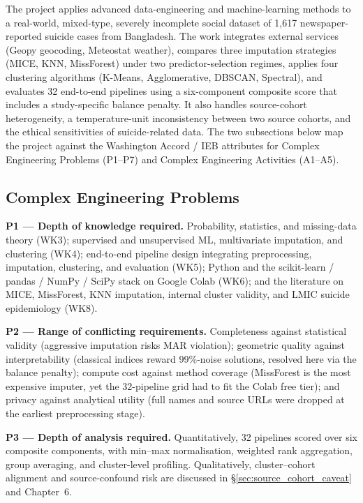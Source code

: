 The project applies advanced data-engineering and machine-learning methods to a real-world, mixed-type, severely incomplete social dataset of 1,617 newspaper-reported suicide cases from Bangladesh. The work integrates external services (Geopy geocoding, Meteostat weather), compares three imputation strategies (MICE, KNN, MissForest) under two predictor-selection regimes, applies four clustering algorithms (K-Means, Agglomerative, DBSCAN, Spectral), and evaluates 32 end-to-end pipelines using a six-component composite score that includes a study-specific balance penalty. It also handles source-cohort heterogeneity, a temperature-unit inconsistency between two source cohorts, and the ethical sensitivities of suicide-related data. The two subsections below map the project against the Washington Accord / IEB attributes for Complex Engineering Problems (P1--P7) and Complex Engineering Activities (A1--A5).

\subsection{Complex Engineering Problems}

\textbf{P1 --- Depth of knowledge required.} Probability, statistics, and missing-data theory (WK3); supervised and unsupervised ML, multivariate imputation, and clustering (WK4); end-to-end pipeline design integrating preprocessing, imputation, clustering, and evaluation (WK5); Python and the scikit-learn / pandas / NumPy / SciPy stack on Google Colab (WK6); and the literature on MICE, MissForest, KNN imputation, internal cluster validity, and LMIC suicide epidemiology (WK8).

\textbf{P2 --- Range of conflicting requirements.} Completeness against statistical validity (aggressive imputation risks MAR violation); geometric quality against interpretability (classical indices reward 99\%-noise solutions, resolved here via the balance penalty); compute cost against method coverage (MissForest is the most expensive imputer, yet the 32-pipeline grid had to fit the Colab free tier); and privacy against analytical utility (full names and source URLs were dropped at the earliest preprocessing stage).

\textbf{P3 --- Depth of analysis required.} Quantitatively, 32 pipelines scored over six composite components, with min--max normalisation, weighted rank aggregation, group averaging, and cluster-level profiling. Qualitatively, cluster--cohort alignment and source-confound risk are discussed in \S\ref{sec:source_cohort_caveat} and Chapter~6.

